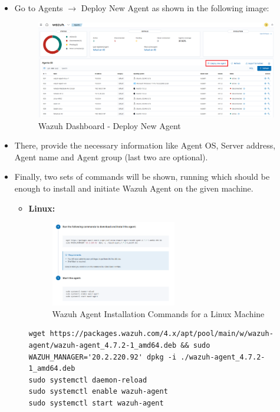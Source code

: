 \begin{itemize}
  \item Go to Agents \(\rightarrow\) Deploy New Agent as shown in the following image:
    \begin{figure}[H]
      \centering
      \includegraphics[width=\textwidth]{images/setup/newagent-option.png}
      \caption{Wazuh Dashboard - Deploy New Agent}
    \end{figure}
  \item There, provide the necessary information like Agent OS, Server address, Agent name and Agent group (last two are optional).
  \item Finally, two sets of commands will be shown, running which should be enough to install and initiate Wazuh Agent on the given machine.
  \begin{itemize}
    \item \textbf{Linux:}
    \begin{figure}[H]
      \centering
      \includegraphics[width=0.55\textwidth]{images/setup/wazuh-agent-commands-linux.png}
      \caption{Wazuh Agent Installation Commands for a Linux Machine}
    \end{figure}
    \begin{verbatim}
wget https://packages.wazuh.com/4.x/apt/pool/main/w/wazuh-agent/wazuh-agent_4.7.2-1_amd64.deb && sudo WAZUH_MANAGER='20.2.220.92' dpkg -i ./wazuh-agent_4.7.2-1_amd64.deb
sudo systemctl daemon-reload
sudo systemctl enable wazuh-agent
sudo systemctl start wazuh-agent
    \end{verbatim}


\end{itemize}
\end{itemize}
